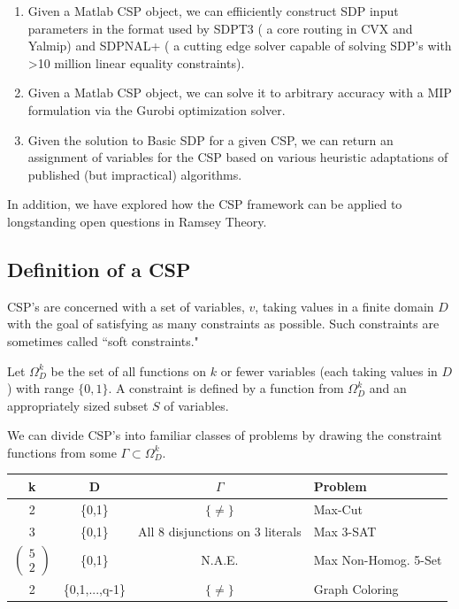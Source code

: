 \documentclass[11pt]{article} %
\begin{document}
\begin{enumerate}
\item Given a Matlab CSP object, we can effiiciently construct SDP input parameters in the format used by SDPT3 ( a core routing in CVX and Yalmip) and SDPNAL+ ( a cutting edge solver capable of solving SDP's with >10 million linear equality constraints).

\item Given a Matlab CSP object, we can solve it to arbitrary accuracy with a MIP formulation via the Gurobi optimization solver.

\item Given the solution to Basic SDP for a given CSP, we can return an assignment of variables for the CSP based on various heuristic adaptations of published (but impractical) algorithms.
\end{enumerate}

In addition, we have explored how the CSP framework can be applied to longstanding open questions in Ramsey Theory.

\subsection{Definition of a CSP}

CSP's are concerned with a set of variables, $v$, taking values in a finite domain $D$ with the goal of satisfying as many constraints as possible. Such constraints are sometimes called ``soft constraints."

Let $\Omega_D^k$ be the set of all functions on $k$ or fewer variables (each taking values in $D$) with range $\{ 0,1 \}$. A constraint is defined by a function from $\Omega_D^k$ and an appropriately sized subset $S$ of variables.

We can divide CSP's into familiar classes of problems by drawing the constraint functions from some $\Gamma \subset \Omega_D^k$.

\begin{tabular}{c c c l}
\hline
k & D & $\Gamma$ & Problem \\
\hline
2 & \{0,1\} & $\{\neq\}$ & Max-Cut \\
3 & \{0,1\} & All 8 disjunctions on 3 literals & Max 3-SAT \\
$\left(\begin{array}{c}
      5 \\
      2
    \end{array}\right)$
& \{0,1\} & N.A.E. & Max Non-Homog. 5-Set \\
2 & \{0,1,...,q-1\} & $\{\neq\}$ & Graph Coloring \\
\hline
\end{tabular}
\end{document}
